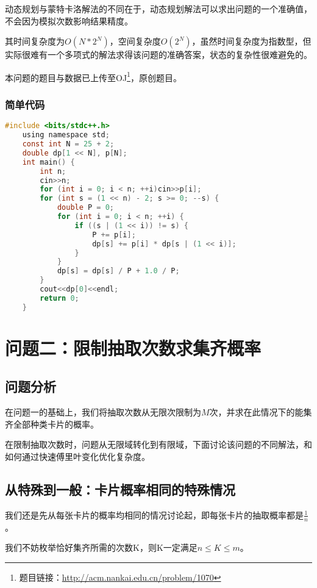 \documentclass[master]{thesis-uestc}
\begin{document}
动态规划与蒙特卡洛解法的不同在于，动态规划解法可以求出问题的一个准确值，不会因为模拟次数影响结果精度。

其时间复杂度为$O(N * 2^N)$，空间复杂度$O(2^N)$，虽然时间复杂度为指数型，但实际很难有一个多项式的解法求得该问题的准确答案，状态的复杂性很难避免的。

本问题的题目与数据已上传至OJ\footnote{题目链接：\url{http://acm.nankai.edu.cn/problem/1070} }，原创题目。

\subsection{简单代码}


\begin{lstlisting}[frame=shadowbox,language=C] 
    #include <bits/stdc++.h>
    using namespace std;
    const int N = 25 + 2;
    double dp[1 << N], p[N];
    int main() {
        int n;
        cin>>n;
        for (int i = 0; i < n; ++i)cin>>p[i];
        for (int s = (1 << n) - 2; s >= 0; --s) {
            double P = 0;
            for (int i = 0; i < n; ++i) {
                if ((s | (1 << i)) != s) {
                    P += p[i];
                    dp[s] += p[i] * dp[s | (1 << i)];
                }
            }
            dp[s] = dp[s] / P + 1.0 / P;
        }
        cout<<dp[0]<<endl;
        return 0;
    }
    \end{lstlisting} 

\chapter{问题二：限制抽取次数求集齐概率}

\section{问题分析}

在问题一的基础上，我们将抽取次数从无限次限制为$M$次，并求在此情况下的能集齐全部种类卡片的概率。

在限制抽取次数时，问题从无限域转化到有限域，下面讨论该问题的不同解法，和如何通过快速傅里叶变化优化复杂度。

\section{从特殊到一般：卡片概率相同的特殊情况}

我们还是先从每张卡片的概率均相同的情况讨论起，即每张卡片的抽取概率都是$\frac{1}{n}$。

我们不妨枚举恰好集齐所需的次数K，则K一定满足$n\leq K\leq m$。
\end{document}
